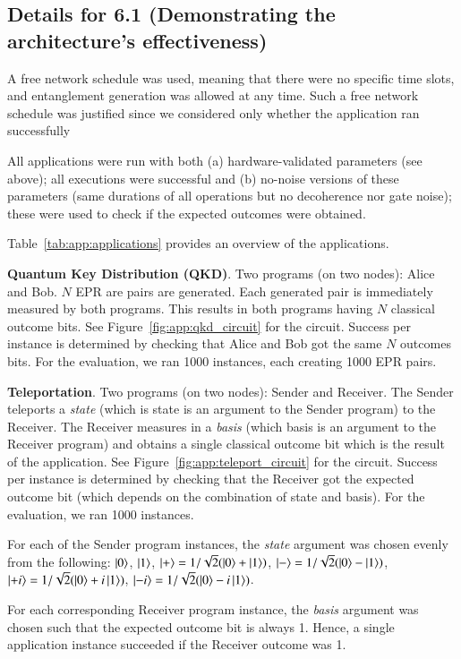 \subsection{Details for 6.1 (Demonstrating the architecture's effectiveness)}
\label{sec:app:details_6_1}
A free network schedule was used, meaning that there were no specific time slots, and entanglement generation was allowed at any time.
Such a free network schedule was justified since we considered only whether the application ran successfully

All applications were run with both (a) hardware-validated parameters (see above); all executions were successful and (b) no-noise versions of these parameters (same durations of all operations but no decoherence nor gate noise); these were used to check if the expected outcomes were obtained.

Table~\ref{tab:app:applications} provides an overview of the applications.

\textbf{Quantum Key Distribution (QKD)}. 
Two programs (on two nodes): Alice and Bob. $N$ EPR are pairs are generated. Each generated pair is immediately measured by both programs.
This results in both programs having $N$ classical outcome bits.
See Figure~\ref{fig:app:qkd_circuit} for the circuit.
Success per instance is determined by checking that Alice and Bob got the same $N$ outcomes bits.
For the evaluation, we ran 1000 instances, each creating 1000 EPR pairs.

\textbf{Teleportation}.
Two programs (on two nodes): Sender and Receiver. The Sender teleports a \textit{state} (which is state is an argument to the Sender program) to the Receiver.
The Receiver measures in a \textit{basis} (which basis is an argument to the Receiver program) and obtains a single classical outcome bit which is the result of the application.
See Figure~\ref{fig:app:teleport_circuit} for the circuit.
Success per instance is determined by checking that the Receiver got the expected outcome bit (which depends on the combination of state and basis).
For the evaluation, we ran 1000 instances.

For each of the Sender program instances, the \textit{state} argument was chosen evenly from the following:
$\ket{0}$,
$\ket{1}$,
$\ket{+} = 1/\sqrt{2} (\ket{0} + \ket{1})$,
$\ket{-} = 1/\sqrt{2} (\ket{0} - \ket{1})$,
$\ket{+i} = 1/\sqrt{2} (\ket{0} + i \ket{1})$,
$\ket{-i} = 1/\sqrt{2} (\ket{0} - i \ket{1})$.

For each corresponding Receiver program instance, the \textit{basis} argument was chosen such that the expected outcome bit is always 1.
Hence, a single application instance succeeded if the Receiver outcome was 1.

